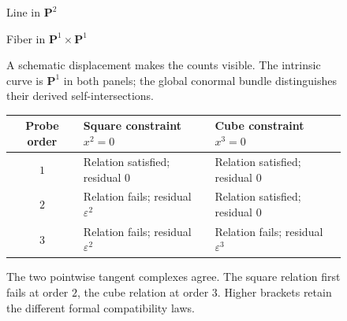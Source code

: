 \expandafter\def\csname derivativefigure@self-intersection\endcsname{%
\begin{figure}[H]
\centering
\begin{minipage}[t]{.48\linewidth}\centering
{\fontsize{10}{12}\selectfont\sffamily Line in \(\mathbf P^2\)}\par\smallskip
{}
\end{minipage}\hfill
\begin{minipage}[t]{.48\linewidth}\centering
{\fontsize{10}{12}\selectfont\sffamily Fiber in \(\mathbf P^1\times\mathbf P^1\)}\par\smallskip
{}
\end{minipage}
\caption{A schematic displacement makes the counts visible. The intrinsic curve is \(\mathbf P^1\) in both panels; the global conormal bundle distinguishes their derived self-intersections.}
\label{fig:self-intersection}
\end{figure}%
}

\expandafter\def\csname derivativefigure@probes\endcsname{%
\begin{figure}[H]
\centering
{}
{\fontsize{10}{12}\selectfont
\begin{tabularx}{.94\linewidth}{@{}cXX@{}}
\toprule
Probe order&Square constraint \(x^2=0\)&Cube constraint \(x^3=0\)\\
\midrule
\(1\)&Relation satisfied; residual \(0\)&Relation satisfied; residual \(0\)\\
\(2\)&Relation fails; residual \(\varepsilon^2\)&Relation satisfied; residual \(0\)\\
\(3\)&Relation fails; residual \(\varepsilon^2\)&Relation fails; residual \(\varepsilon^3\)\\
\bottomrule
\end{tabularx}}
\caption{The two pointwise tangent complexes agree. The square relation first fails at order \(2\), the cube relation at order \(3\). Higher brackets retain the different formal compatibility laws.}
\label{fig:probes}
\end{figure}%
}

